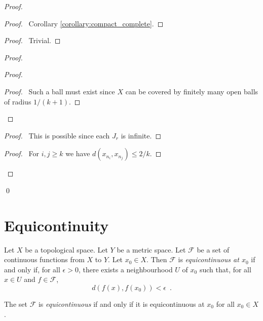\begin{proof}
    \pf
    \begin{proof}
        \pf\ Corollary \ref{corollary:compact_complete}.
    \end{proof}
    \begin{proof}
        \pf\ Trivial.
    \end{proof}
    \begin{proof}
        \begin{proof}
            \begin{proof}
                \pf\ Such a ball must exist since $X$ can be covered by finitely many open balls of radius $1 / (k+1)$.
            \end{proof}
        \end{proof}
        \begin{proof}
            \pf\ This is possible since each $J_r$ is infinite.
        \end{proof}
        \begin{proof}
            \pf\ For $i,j \geq k$ we have $d(x_{n_i},x_{n_j}) \leq 2/k$.
        \end{proof}
    \end{proof}
    \qed
\end{proof}

\section{Equicontinuity}

\begin{definition}[Equicontinuous]
    Let $X$ be a topological space. Let $Y$ be a metric space. Let $\mathcal{F}$ be a set of continuous functions from $X$ to $Y$.
    Let $x_0 \in X$. Then $\mathcal{F}$ is \emph{equicontinuous at $x_0$} if and only if, for all $\epsilon > 0$, there exists a
    neighbourhood $U$ of $x_0$ such that, for all $x \in U$ and $f \in \mathcal{F}$,
    \[ d(f(x),f(x_0)) < \epsilon \enspace . \]

    The set $\mathcal{F}$ is \emph{equicontinuous} if and only if it is equicontinuous at $x_0$ for all $x_0 \in X$.
\end{definition}

